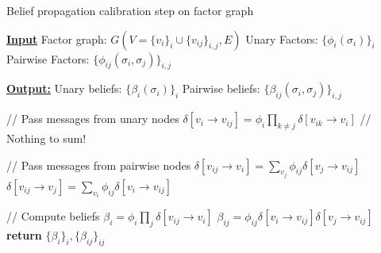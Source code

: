 \documentclass{article}
\begin{document}
\begin{algorithm}
    \caption{Belief propagation calibration step on factor graph}
    \begin{algorithmic}[1]
        \Statex \underline{\textbf{Input}}
        \Statex \quad Factor graph: $G(V = \{v_i\}_i \cup \{v_{ij}\}_{i, j}, E)$
        \Statex \quad Unary Factors: $\{\phi_i(\sigma_i)\}_i$
        \Statex \quad Pairwise Factors: $\{\phi_{ij}(\sigma_i, \sigma_j)\}_{i, j}$

        \Statex \underline{\textbf{Output:}}
        \Statex \quad Unary beliefs: $\{\beta_i(\sigma_i)\}_i$
        \Statex \quad Pairwise beliefs: $\{\beta_{ij}(\sigma_i, \sigma_j)\}_{i, j}$
        
        \Statex // Pass messages from unary nodes
        \State $\delta[v_i \rightarrow v_{ij}] = \phi_i \prod_{k \neq j} \delta[v_{ik} \rightarrow v_i]$ \quad // Nothing to sum!
        \EndFor
        \EndFor

        \Statex // Pass messages from pairwise nodes
        \State $\delta[v_{ij} \rightarrow v_i] = \sum_{v_j} \phi_{ij} \delta[v_j \rightarrow v_{ij}]$
        \State $\delta[v_{ij} \rightarrow v_j] = \sum_{v_i} \phi_{ij} \delta[v_i \rightarrow v_{ij}]$
        \EndFor
        \EndFor

        \Statex // Compute beliefs
        \State $\beta_i = \phi_i \prod_{j} \delta[v_{ij} \rightarrow v_i]$
        \EndFor
        \State $\beta_{ij} = \phi_{ij} \delta[v_i \rightarrow v_{ij}] \delta[v_j \rightarrow v_{ij}]$
        \EndFor
        \State \textbf{return } $\{\beta_i\}_i, \{\beta_{ij}\}_{ij}$
    \end{algorithmic}
    \label{alg:bp}
\end{algorithm}
\end{document}
